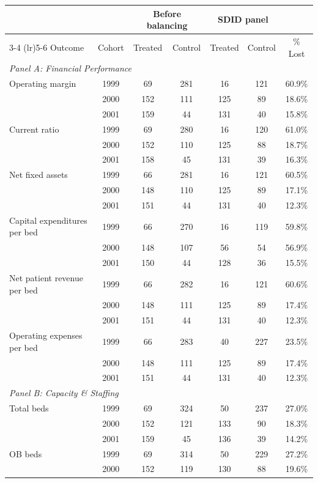 \begin{tabular}{l c cc cc c}
\toprule
 & & \multicolumn{2}{c}{Before balancing} & \multicolumn{2}{c}{SDID panel} & \\
\cmidrule(lr){3-4} \cmidrule(lr){5-6}
Outcome & Cohort & Treated & Control & Treated & Control & \% Lost \\
\midrule
\multicolumn{7}{l}{\textit{Panel A: Financial Performance}} \\
Operating margin & 1999 & 69 & 281 & 16 & 121 & 60.9\% \\
 & 2000 & 152 & 111 & 125 & 89 & 18.6\% \\
 & 2001 & 159 & 44 & 131 & 40 & 15.8\% \\
Current ratio & 1999 & 69 & 280 & 16 & 120 & 61.0\% \\
 & 2000 & 152 & 110 & 125 & 88 & 18.7\% \\
 & 2001 & 158 & 45 & 131 & 39 & 16.3\% \\
Net fixed assets & 1999 & 66 & 281 & 16 & 121 & 60.5\% \\
 & 2000 & 148 & 110 & 125 & 89 & 17.1\% \\
 & 2001 & 151 & 44 & 131 & 40 & 12.3\% \\
Capital expenditures per bed & 1999 & 66 & 270 & 16 & 119 & 59.8\% \\
 & 2000 & 148 & 107 & 56 & 54 & 56.9\% \\
 & 2001 & 150 & 44 & 128 & 36 & 15.5\% \\
Net patient revenue per bed & 1999 & 66 & 282 & 16 & 121 & 60.6\% \\
 & 2000 & 148 & 111 & 125 & 89 & 17.4\% \\
 & 2001 & 151 & 44 & 131 & 40 & 12.3\% \\
Operating expenses per bed & 1999 & 66 & 283 & 40 & 227 & 23.5\% \\
 & 2000 & 148 & 111 & 125 & 89 & 17.4\% \\
 & 2001 & 151 & 44 & 131 & 40 & 12.3\% \\
\midrule
\multicolumn{7}{l}{\textit{Panel B: Capacity \& Staffing}} \\
Total beds & 1999 & 69 & 324 & 50 & 237 & 27.0\% \\
 & 2000 & 152 & 121 & 133 & 90 & 18.3\% \\
 & 2001 & 159 & 45 & 136 & 39 & 14.2\% \\
OB beds & 1999 & 69 & 314 & 50 & 229 & 27.2\% \\
 & 2000 & 152 & 119 & 130 & 88 & 19.6\% \\

\end{tabular}
